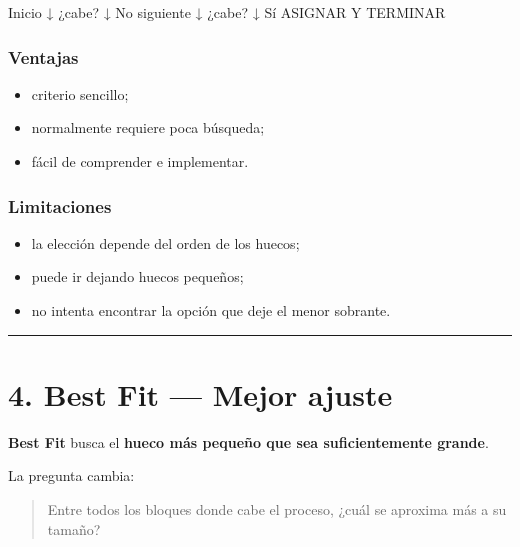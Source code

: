 \documentclass[
  spanish,
  letterpaper,
]{scrbook}
\newenvironment{Shaded}{\begin{snugshade}}{\end{snugshade}}
\newcommand{\NormalTok}[1]{\textcolor[rgb]{0.00,0.23,0.31}{#1}}
\providecommand{\tightlist}{%
  \setlength{\itemsep}{0pt}\setlength{\parskip}{0pt}}
\begin{document}
\begin{Shaded}
\begin{Highlighting}[]
\NormalTok{Inicio}
\NormalTok{  ↓}
\NormalTok{¿cabe?}
\NormalTok{  ↓ No}
\NormalTok{siguiente}
\NormalTok{  ↓}
\NormalTok{¿cabe?}
\NormalTok{  ↓ Sí}
\NormalTok{ASIGNAR Y TERMINAR}
\end{Highlighting}
\end{Shaded}

\subsection{Ventajas}\label{ventajas-11}

\begin{itemize}
\tightlist
\item
  criterio sencillo;
\item
  normalmente requiere poca búsqueda;
\item
  fácil de comprender e implementar.
\end{itemize}

\subsection{Limitaciones}\label{limitaciones-2}

\begin{itemize}
\tightlist
\item
  la elección depende del orden de los huecos;
\item
  puede ir dejando huecos pequeños;
\item
  no intenta encontrar la opción que deje el menor sobrante.
\end{itemize}

\begin{center}\rule{0.5\linewidth}{0.5pt}\end{center}


\chapter{4. Best Fit --- Mejor ajuste}\label{best-fit-mejor-ajuste}

\textbf{Best Fit} busca el \textbf{hueco más pequeño que sea
suficientemente grande}.

La pregunta cambia:

\begin{quote}
Entre todos los bloques donde cabe el proceso, ¿cuál se aproxima más a
su tamaño?
\end{quote}
\end{document}
